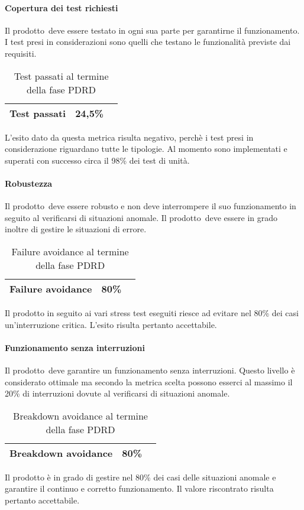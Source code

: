\documentclass[../PianoDiQualifica.tex]{subfiles}
\begin{document}
\begin{appendices}
			\paragraph{Copertura dei test richiesti}
				Il prodotto\g\ deve essere testato in ogni sua parte per garantirne il funzionamento. I test presi in considerazioni sono quelli che testano le funzionalità previste dai requisiti.
			\begin{table}[H]
				\centering
				\begin{tabular}{l * {2}{c}}
					\midrule
					Test passati & 24,5\% \\
					\midrule
				\end{tabular}
				\caption{Test passati al termine della fase PDRD}
				\label{tab:copertura_test}
			\end{table}
			L'esito dato da questa metrica risulta negativo, perchè i test presi in considerazione riguardano tutte le tipologie. Al momento sono implementati e superati con successo circa il 98\% dei test di unità. 
			
			\paragraph{Robustezza}
				Il prodotto\g\ deve essere robusto e non deve interrompere il suo funzionamento in seguito al verificarsi di situazioni anomale\g. Il prodotto\g\ deve essere in grado inoltre di gestire le situazioni di errore.
			\begin{table}[H]
				\centering
				\begin{tabular}{l * {2}{c}}
					\midrule
					Failure avoidance & 80\% \\
					\midrule
				\end{tabular}
				\caption{Failure avoidance al termine della fase PDRD}
				\label{tab:failure_avoidance}
			\end{table}
			Il prodotto in seguito ai vari stress test eseguiti riesce ad evitare nel 80\% dei casi un'interruzione critica. L'esito risulta pertanto accettabile. 
			
			\paragraph{Funzionamento senza interruzioni}
				Il prodotto\g\ deve garantire un funzionamento senza interruzioni. Questo livello è considerato ottimale ma secondo la metrica scelta possono esserci al massimo il 20\% di interruzioni dovute al verificarsi di situazioni anomale\g.
			\begin{table}[H]
				\centering
				\begin{tabular}{l * {2}{c}}
					\midrule
					Breakdown avoidance & 80\% \\
					\midrule
				\end{tabular}
				\caption{Breakdown avoidance al termine della fase PDRD}
				\label{tab:breakdown_avoidance}
			\end{table}	
			Il prodotto è in grado di gestire nel 80\% dei casi delle situazioni anomale e garantire il continuo e corretto funzionamento. Il valore riscontrato risulta pertanto accettabile.
				
	
\end{appendices}
\end{document}
